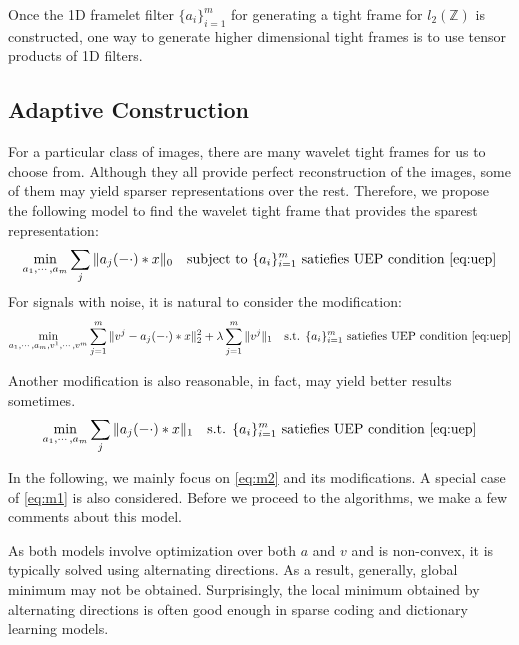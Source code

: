 \documentclass[a4paper]{article}
\begin{document}
{{Once the 1D framelet filter $\{a_i\}_{i=1}^m$ for generating a tight frame for $l_2(\mathbb{Z})$ is constructed, one way to generate higher dimensional tight frames is to use tensor products of 1D filters.
}


\subsection{Adaptive Construction}
For a particular class of images, there are many wavelet tight frames for us to choose from. Although they all provide perfect reconstruction of the images, some of them may yield sparser representations over the rest. Therefore, we propose the following model to find the wavelet tight frame that provides the sparest representation:
\begin{equation}
	\min_{a_1,\cdots,a_m} \sum_j \|a_j(-\cdot)*x\|_0 \quad \textrm{subject to } \{a_i\}_{i=1}^m \textrm{ satiefies UEP condition \eqref{eq:uep}}
\end{equation}
For signals with noise, it is natural to consider the modification:
\begin{equation}
\label{eq:m1}
	\min_{a_1,\cdots,a_m,v^1,\cdots,v^m}  \sum_{j=1}^m \|v^j - a_j(-\cdot)*x\|_2^2 + \lambda \sum_{j=1}^m \|v^j\|_1 \quad \textrm{s.t. } \{a_i\}_{i=1}^m \textrm{ satiefies UEP condition \eqref{eq:uep}}
\end{equation}

Another modification is also reasonable, in fact, may yield better results sometimes.
\begin{equation}
\label{eq:m2}
	\min_{a_1,\cdots,a_m}  \sum_j \|a_j(-\cdot)*x\|_1 \quad \textrm{s.t. } \{a_i\}_{i=1}^m \textrm{ satiefies UEP condition \eqref{eq:uep}}
\end{equation}

In the following, we mainly focus on \eqref{eq:m2} and its modifications. A special case of \eqref{eq:m1} is also considered.
Before we proceed to the algorithms, we make a few comments about this model. 

As both models involve optimization over both $a$ and $v$ and is non-convex, it is typically solved using alternating directions. As a result, generally, global minimum may not be obtained. Surprisingly, the local minimum obtained by alternating directions is often good enough in sparse coding and dictionary  learning models.

}
\end{document}
